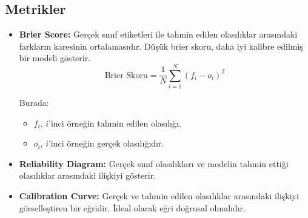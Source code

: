 \subsection{Metrikler}
\begin{itemize}
    \item \textbf{Brier Score:} Gerçek sınıf etiketleri ile tahmin edilen olasılıklar arasındaki farkların karesinin ortalamasıdır. Düşük brier skoru, daha iyi kalibre edilmiş bir modeli gösterir.
    \begin{equation*}
    \text{Brier Skoru} = \frac{1}{N} \sum_{i=1}^{N} (f_i - o_i)^2
    \end{equation*}
    
    Burada:
    \begin{itemize}
        \item $f_i$, $i$'inci örneğin tahmin edilen olasılığı,
        \item $o_i$, $i$'inci örneğin gerçek olasılığıdır.
    \end{itemize}
    \item \textbf{Reliability Diagram:} Gerçek sınıf olasılıkları ve modelin tahmin ettiği olasılıklar arasındaki ilişkiyi gösterir.
    \item \textbf{Calibration Curve:} Gerçek ve tahmin edilen olasılıklar arasındaki ilişkiyi görselleştiren bir eğridir. İdeal olarak eğri doğrusal olmalıdır.
\end{itemize}

\newpage